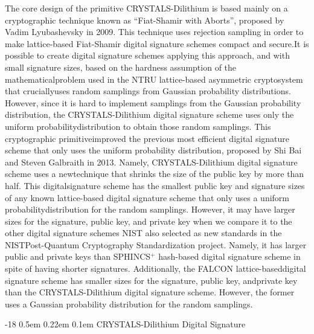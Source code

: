 \documentclass[runningheads]{llncs}
\makeatletter
\renewcommand\subsubsection{\@startsection{subsubsection}{3}{\z@}%
                       {-18\p@ \@plus -4\p@ \@minus -4\p@}%
                       {0.5em \@plus 0.22em \@minus 0.1em}%
                       {\normalfont\normalsize\bfseries\boldmath}}
\numberwithin{equation}{section}
\makeatother
\begin{document}
    \noindent The core design of the primitive CRYSTALS-Dilithium is based mainly on a cryptographic technique known as ``Fiat-Shamir with Aborts'', proposed by Vadim Lyubashevsky in 2009. This technique uses rejection sampling in order to make lattice-based Fiat-Shamir digital signature schemes compact and secure.\break It is possible to create digital signature schemes applying this approach, and with small signature sizes, based on the hardness assumption of the mathematical\break problem used in the NTRU lattice-based asymmetric cryptosystem that crucially\break uses random samplings from Gaussian probability distributions. However, since it is hard to implement samplings from the Gaussian probability distribution, the CRYSTALS-Dilithium digital signature scheme uses only the uniform probability\break distribution to obtain those random samplings. This cryptographic primitive\break improved the previous most efficient digital signature scheme that only uses the uniform probability distribution, proposed by Shi Bai and Steven Galbraith in 2013. Namely, CRYSTALS-Dilithium digital signature scheme uses a new\break technique that shrinks the size of the public key by more than half. This digital\break signature scheme has the smallest public key and signature sizes of any known lattice-based digital signature scheme that only uses a uniform probability\break distribution for the random samplings. However, it may have larger sizes for the signature, public key, and private key when we compare it to the other digital signature schemes NIST also selected as new standards in the NIST\break Post-Quantum Cryptography Standardization project. Namely, it has larger public and private keys than SPHINCS${}^{+}$ hash-based digital signature scheme in spite of having shorter signatures. Additionally, the FALCON lattice-based\break digital signature scheme has smaller sizes for the signature, public key, and\break private key than the CRYSTALS-Dilithium digital signature scheme. However, the former uses a Gaussian probability distribution for the random samplings.


    \subsubsection{CRYSTALS-Dilithium Digital Signature}
    \label{subsubsec:crystals-dilithium-digital-signature}
\end{document}

